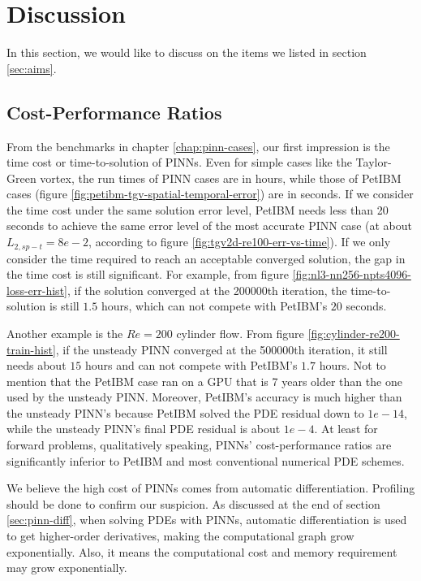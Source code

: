 
\section{Discussion}

In this section, we would like to discuss on the items we listed in section \ref{sec:aims}.

\subsection*{Cost-Performance Ratios}

From the benchmarks in chapter \ref{chap:pinn-cases}, our first impression is the time cost or time-to-solution of PINNs.
Even for simple cases like the Taylor-Green vortex, the run times of PINN cases are in hours, while those of PetIBM cases (figure \ref{fig:petibm-tgv-spatial-temporal-error}) are in seconds.
If we consider the time cost under the same solution error level, PetIBM needs less than 20 seconds to achieve the same error level of the most accurate PINN case (at about $L_{2,sp-t}=8e-2$, according to figure \ref{fig:tgv2d-re100-err-vs-time}).
If we only consider the time required to reach an acceptable converged solution, the gap in the time cost is still significant.
For example, from figure \ref{fig:nl3-nn256-npts4096-loss-err-hist}, if the solution converged at the \num{200000}th iteration, the time-to-solution is still $1.5$ hours, which can not compete with PetIBM's $20$ seconds.

Another example is the $Re=200$ cylinder flow.
From figure \ref{fig:cylinder-re200-train-hist}, if the unsteady PINN converged at the \num{500000}th iteration, it still needs about $15$ hours and can not compete with PetIBM's $1.7$ hours.
Not to mention that the PetIBM case ran on a GPU that is 7 years older than the one used by the unsteady PINN.
Moreover, PetIBM's accuracy is much higher than the unsteady PINN's because PetIBM solved the PDE residual down to $1e-14$, while the unsteady PINN's final PDE residual is about $1e-4$.
At least for forward problems, qualitatively speaking, PINNs' cost-performance ratios are significantly inferior to PetIBM and most conventional numerical PDE schemes.

We believe the high cost of PINNs comes from automatic differentiation.
Profiling should be done to confirm our suspicion.
As discussed at the end of section \ref{sec:pinn-diff}, when solving PDEs with PINNs, automatic differentiation is used to get higher-order derivatives, making the computational graph grow exponentially.
Also, it means the computational cost and memory requirement may grow exponentially.

